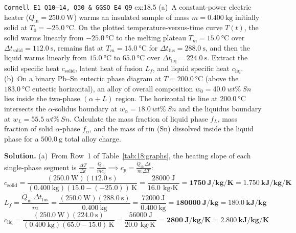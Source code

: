 \begin{workedexample}{\texttt{Cornell E1 Q10--14, Q30 \& GGSO E4 Q9} }{ex:18.5}
(a)~A constant-power electric heater ($\dot{Q}_{\mathrm{in}} = \SI{250.0}{\watt}$) warms an insulated sample of mass $m = \SI{0.400}{\kilogram}$ initially solid at $T_0 = \SI{-25.0}{\celsius}$. On the plotted temperature-versus-time curve $T(t)$, the solid warms linearly from $\SI{-25.0}{\celsius}$ to the melting plateau $T_m = \SI{15.0}{\celsius}$ over $\Delta t_{\mathrm{solid}} = \SI{112.0}{\second}$, remains flat at $T_m = \SI{15.0}{\celsius}$ for $\Delta t_{\mathrm{fus}} = \SI{288.0}{\second}$, and then the liquid warms linearly from $\SI{15.0}{\celsius}$ to $\SI{65.0}{\celsius}$ over $\Delta t_{\mathrm{liq}} = \SI{224.0}{\second}$. Extract the solid specific heat $c_{\mathrm{solid}}$, latent heat of fusion $L_f$, and liquid specific heat $c_{\mathrm{liq}}$.
(b)~On a binary $\mathrm{Pb\text{--}Sn}$ eutectic phase diagram at $T = \SI{200.0}{\celsius}$ (above the $\SI{183.0}{\celsius}$ eutectic horizontal), an alloy of overall composition $w_0 = \SI{40.0}{wt\%\ Sn}$ lies inside the two-phase $(\alpha + L)$ region. The horizontal tie line at $\SI{200.0}{\celsius}$ intersects the $\alpha$-solidus boundary at $w_\alpha = \SI{18.0}{wt\%\ Sn}$ and the liquidus boundary at $w_L = \SI{55.5}{wt\%\ Sn}$. Calculate the mass fraction of liquid phase $f_L$, mass fraction of solid $\alpha$-phase $f_\alpha$, and the mass of tin ($\mathrm{Sn}$) dissolved inside the liquid phase for a $\SI{500.0}{\gram}$ total alloy charge.
\par\smallskip\noindent
\textbf{Solution.}
(a)~From Row~1 of Table~\ref{tab:18:graphs}, the heating slope of each single-phase segment is $\frac{\Delta T}{\Delta t} = \frac{\dot{Q}_{\mathrm{in}}}{m c_p} \implies c_p = \frac{\dot{Q}_{\mathrm{in}}\,\Delta t}{m\,\Delta T}$:
$$c_{\mathrm{solid}} = \frac{(\SI{250.0}{\watt})(\SI{112.0}{\second})}{(\SI{0.400}{\kilogram})(15.0 - (-25.0))\,\si{\kelvin}} = \frac{\SI{28000}{\joule}}{\SI{16.0}{\kilogram\cdot\kelvin}} = \mathbf{\SI{1750}{\joule\per\kilogram\per\kelvin}} = \mathbf{\SI{1.750}{\kilo\joule\per\kilogram\per\kelvin}}$$
$$L_f = \frac{\dot{Q}_{\mathrm{in}}\,\Delta t_{\mathrm{fus}}}{m} = \frac{(\SI{250.0}{\watt})(\SI{288.0}{\second})}{\SI{0.400}{\kilogram}} = \frac{\SI{72000}{\joule}}{\SI{0.400}{\kilogram}} = \mathbf{\SI{180000}{\joule\per\kilogram}} = \mathbf{\SI{180.0}{\kilo\joule\per\kilogram}}$$
$$c_{\mathrm{liq}} = \frac{(\SI{250.0}{\watt})(\SI{224.0}{\second})}{(\SI{0.400}{\kilogram})(65.0 - 15.0)\,\si{\kelvin}} = \frac{\SI{56000}{\joule}}{\SI{20.0}{\kilogram\cdot\kelvin}} = \mathbf{\SI{2800}{\joule\per\kilogram\per\kelvin}} = \mathbf{\SI{2.800}{\kilo\joule\per\kilogram\per\kelvin}}$$

\end{workedexample}
